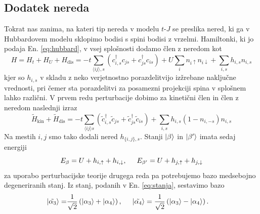 {\begin{appendices}
\section{Dodatek nereda}
Tokrat nas zanima, na kateri tip nereda v modelu $t$-$J$ se preslika nered, ki ga v Hubbardovem modelu sklopimo bodisi s spini bodisi z vrzelmi. Hamiltonki, ki jo podaja En. \eqref{eq:hubbard}, v vsej splošnosti dodamo člen z neredom kot 
\begin{equation}
H=H_t + H_U + H_\mathrm{dis}=-t\sum\limits_{\langle ij \rangle, s}\left(c^\dagger_{i,s} c_{js} + c^\dagger_{js}c_{is}\right) + U\sum_i n_{i\uparrow}n_{i\downarrow} + \sum\limits_{i,s} h_{i,s} n_{i, s}  
\end{equation}
kjer so $h_{i,s}$ v skladu z neko verjetnostno porazdelitvijo izžrebane naključne vrednosti, pri čemer sta porazdelitvi za posamezni projekciji spina v splošnem lahko različni. V prvem redu perturbacije dobimo za kinetični člen in člen z neredom naslednji izraz
\begin{equation}
\tilde{H}_\mathrm{kin} + \tilde{H}_\mathrm{dis} = -t\sum\limits_{\langle ij \rangle s} \left(\tilde{c}^\dagger_{i,s} \tilde{c}_{js} + \tilde{c}^\dagger_{js}\tilde{c}_{is}\right) +\sum\limits_{i,s} h_{i,s} \left(1-n_{i,-s}\right)n_{i,s}
\end{equation}
Na mestih $i, j$ smo tako dodali nered $h_{\{i,j\},s}$. Stanji $\vert\beta\rangle$ in $\vert\beta'\rangle$ imata sedaj energiji 
\begin{equation}
E_\beta = U + h_{i,\uparrow} + h_{i,\downarrow}, \hspace{5mm} E_{\beta'}= U + h_{j, \uparrow} + h_{j,\downarrow} 
\end{equation}
za uporabo perturbacijske teorije drugega reda pa potrebujemo bazo medsebojno degeneriranih stanj. Iz stanj, podanih v En. \eqref{eq:stanja}, sestavimo bazo 
\begin{equation}
\begin{split}
\vert\tilde{\alpha_3}\rangle=&\frac{1}{\sqrt{2}}\left( \vert\alpha_3\rangle + \vert\alpha_4\rangle\right), \hspace{ 5mm}\vert\tilde{\alpha_4}\rangle=\frac{1}{\sqrt{2}}\left(\vert\alpha_3\rangle - \vert\alpha_4\rangle\right).
\end{split}
\end{equation}

\end{appendices}}
